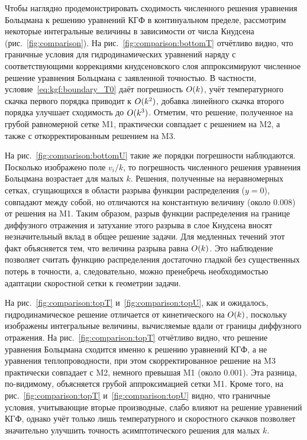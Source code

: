 Чтобы наглядно продемонстрировать сходимость численного решения уравнения Больцмана к
решению уравнений КГФ в континуальном пределе, рассмотрим некоторые интегральные величины
в зависимости от числа Кнудсена (рис.~\ref{fig:comparison}).
На рис.~\ref{fig:comparison:bottomT} отчётливо видно, что граничные условия для гидродинамических уравнений
наряду с соответствующими коррекциями кнудсеновского слоя
аппроксимируют численное решение уравнения Больцмана с заявленной точностью.
В частности, условие~\eqref{eq:kgf:boundary_T0} даёт погрешность \(O(k)\),
учёт температурного скачка первого порядка приводит к \(O(k^2)\),
добавка линейного скачка второго порядка улучшает сходимость до \(O(k^3)\).
Отметим, что решение, полученное на грубой равномерной сетке M1, практически совпадает с решением на M2,
а также с откорректированным решением на M3.

На рис.~\ref{fig:comparison:bottomU} такие же порядки погрешности наблюдаются.
Посколько изображено поле \(v_i/k\), то погрешность численного решения уравнения Больцмана возрастает для малых \(k\).
Решения, полученные на неравномерных сетках, сгущающихся в области разрыва функции распределения (\(y=0\)),
совпадают между собой, но отличаются на константную величину (около \(0.008\)) от решения на M1.
Таким образом, разрыв функции распределения на границе диффузного отражения и затухание этого разрыва в слое Кнудсена
вносят незначительный вклад в общее решение задачи. Для медленных течений этот факт объясняется тем,
что величина разрыва равна \(O(k)\). Это наблюдение позволяет считать функцию распределения достаточно гладкой
без существенных потерь в точности, а, следовательно, можно пренебречь необходимостью адаптации скоростной сетки
к геометрии задачи.

На рис.~\ref{fig:comparison:topT} и~\ref{fig:comparison:topU}, как и ожидалось, гидродинамическое решение
отличается от кинетического на \(O(k)\), поскольку изображены интегральные величины,
вычисляемые вдали от границы диффузного отражения.
На рис.~\ref{fig:comparison:topT} отчётливо видно, что решение уравнения Больцмана сходится
именно к решению уравнений КГФ, а не уравнения теплопроводности,
при этом скорректированное решение на M3 практически совпадает с M2, немного превышая M1 (около 0.001).
Эта разница, по-видимому, объясняется грубой аппроксимацией сетки M1.
Кроме того, на рис.~\ref{fig:comparison:topT} и~\ref{fig:comparison:topU} видно,
что граничные условия, учитывающие вторые производные, слабо влияют на решение уравнений КГФ,
однако учёт только лишь температурного и скоростного скачков позволяет значительно улучшить точность
асимптотического решения для малых \(k\).

